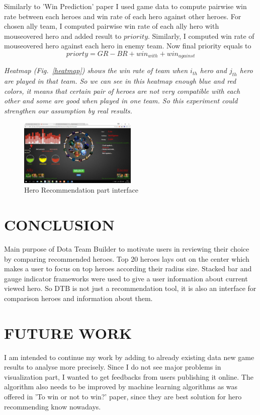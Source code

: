 \documentclass[twocolumn]{autart}    %
\begin{document}
Similarly to 'Win Prediction' paper I  used game data to compute pairwise win rate between each heroes and win rate of each hero against other heroes. For chosen ally team, I computed pairwise win rate of each ally hero with mouseovered hero and added result to $priority$. Similarly, I computed win rate of mouseovered hero against each hero in enemy team.
Now final priority equals to $$priorty = GR - BR + win_{with}+win_{against}$$

 \emph{Heatmap (Fig.~\ref{heatmap}) shows the win rate of team when $i_{th}$ hero and $j_{th}$ hero are played in that team. So we can see in this heatmap enough blue and red colors, it means that certain pair of heroes are not very compatible with each other and some are good when played in one team. So this experiment could strengthen our assumption by real results.}												

\begin{figure}
  \centering
  
    \includegraphics[width=0.5\textwidth]{recomendation.png}
\caption{Hero Recommendation part interface}
 \label{recommendation}
 
\end{figure}



							
											


\section{CONCLUSION}
Main purpose of Dota Team Builder to motivate users in reviewing their choice by comparing recommended heroes. Top 20 heroes lays out on the center which makes a user to focus on top heroes according their radius size. Stacked bar and gauge indicator frameworks were used to give a user information about current viewed hero. So DTB is not just a recommendation tool, it is also an interface for comparison heroes and information  about them.	





\section{FUTURE WORK}																			
I am intended to continue my work by adding to already existing data new game results to analyse more precisely. Since I do not see major problems in visualization part, I wanted to get feedbacks from users publishing it online. The algorithm also needs to be improved by machine learning algorithms as was offered in 'To win or not to win?' paper, since they are best solution for hero recommending know nowadays. 
\end{document}
